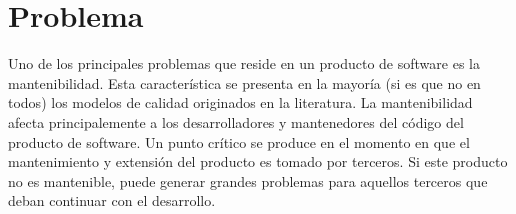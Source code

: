 
\chapter{Problema}

Uno de los principales problemas que reside en un producto de software es la
mantenibilidad. Esta característica se presenta en la mayoría (si es que no en todos) los
modelos de calidad originados en la literatura.
La mantenibilidad afecta principalemente a los desarrolladores y mantenedores del código
del producto de software.
Un punto crítico se produce en el momento en que el mantenimiento y extensión del producto
es tomado por terceros. Si este producto no es mantenible, puede generar grandes problemas
para aquellos terceros que deban continuar con el desarrollo.
